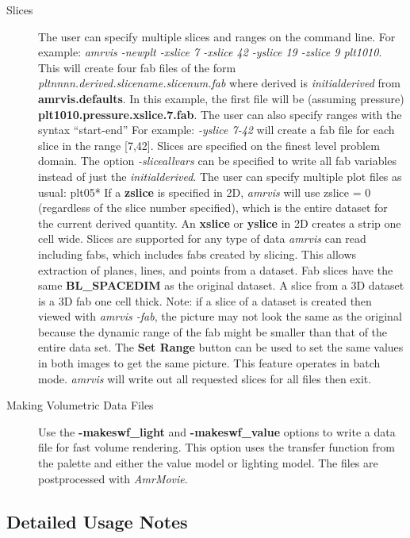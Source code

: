 \documentclass{article}
\begin{document}
\begin{description}
\item [Slices] The user can specify multiple slices and ranges on the command line.
For example:
{\em amrvis -newplt -xslice 7 -xslice 42 -yslice 19 -zslice 9 plt1010}.
This will create four fab files of the form
{\em pltnnnn.derived.slicename.slicenum.fab}
where derived is {\em initialderived} from {\bf amrvis.defaults}.
In this example, the
first file will be (assuming pressure) {\bf plt1010.pressure.xslice.7.fab}.
The user can also specify ranges with the syntax ``start-end''  For example:
{\em -yslice 7-42} will create a fab file for each slice in the range [7,42].
Slices are specified on the finest level problem domain.
The option {\em -sliceallvars} can be specified to write all fab variables
instead of just the {\em initialderived}.
The user can specify multiple plot files as usual:  plt05*
If a {\bf zslice} is specified in 2D, {\em amrvis} will use
zslice = 0 (regardless of the
slice number specified), which is the entire dataset for the current
derived quantity.  An {\bf xslice} or {\bf yslice} in 2D creates
a strip one cell wide.
Slices are supported for any type of data {\em amrvis} can read
including fabs, which includes fabs created by slicing.  This allows
extraction of planes, lines, and points from a dataset.
Fab slices have the same {\bf BL\_SPACEDIM} as the original dataset.  A slice from
a 3D dataset is a 3D fab one cell thick.
Note:  if a slice of a dataset is created then viewed with {\em amrvis -fab},
the picture may not look the same as the original
because the dynamic range of the fab might be smaller than that of
the entire data set.  The {\bf Set Range} button can be used to set
the same values in both images to get the same picture.
This feature operates in batch mode.
{\em amrvis} will write out all requested slices for all files then exit.

\item [Making Volumetric Data Files]  Use the {\bf -makeswf\_light}
and {\bf -makeswf\_value} options to write a data file for fast volume
rendering.  This option uses the transfer function from the palette and either the
value model or lighting model.  The files are postprocessed with
{\em AmrMovie}.

\end{description}



\subsection{Detailed Usage Notes}
\end{document}
